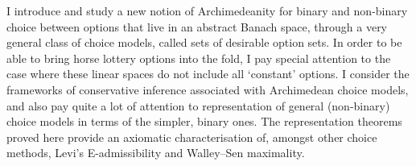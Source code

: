 
I introduce and study a new notion of Archimedeanity for binary and non-binary choice between options that live in an abstract Banach space, through a very general class of choice models, called sets of desirable option sets.
In order to be able to bring horse lottery options into the fold, I pay special attention to the case where these linear spaces do not include all `constant' options.
I consider the frameworks of conservative inference associated with Archimedean choice models, and also pay quite a lot of attention to representation of general (non-binary) choice models in terms of the simpler, binary ones.
The representation theorems proved here provide an axiomatic characterisation of, amongst other choice methods, Levi's E-admissibility and Walley--Sen maximality.


